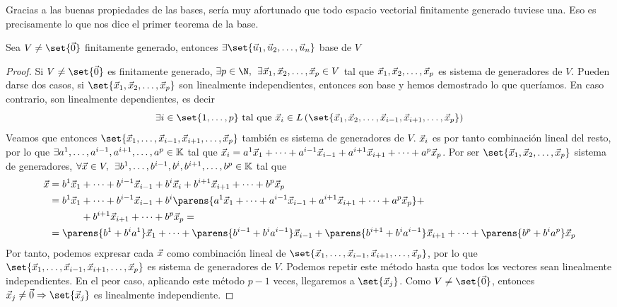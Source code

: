 \documentclass[../algebra_lineal.tex]{subfiles}
\begin{document}
Gracias a las buenas propiedades de las bases, sería muy afortunado que todo espacio vectorial finitamente generado tuviese una. Eso es precisamente lo que nos dice el primer teorema de la base.

\begin{theorem}
    Sea $V \ne \set{\zv}$ finitamente generado, entonces $\exists \set{\vlst{u}{n}}$ base de $V$ 
\end{theorem}

\begin{proof}
    Si $V \ne \set{\zv}$ es finitamente generado, $\exists p \in \N, \spc \exists \vlst{x}{p} \in V$ tal que $\vlst{x}{p}$ es sistema de generadores de $V$. Pueden darse dos casos, si $\set{\vlst{x}{p}}$ son linealmente independientes, entonces son base y hemos demostrado lo que queríamos. En caso contrario, son linealmente dependientes, es decir
    \[
        \exists i \in \set{1, \dots, p} \st \vx_i \in \lspan{\set{\vlst{x}{i-1}, \vx_{i+1}, \dots, \vx_{p}}}
    \]
    Veamos que entonces $\set{\vx_{1}, \dots,  \vx_{i-1}, \vx_{i+1}, \dots, \vx_{p}}$ también es sistema de generadores de $V$. $\vx_i$ es por tanto combinación lineal del resto, por lo que $\exists \islst{a}{p}{i} \in \K$ tal que $\vx_i = \ilincomb{a}{x}{p}{i}$. Por ser $\set{\vlst{x}{p}}$ sistema de generadores, $\forall \vx \in V, \spc \exists \cslst{b}{p}{i} \in \K $ tal que 
    \begin{align*}
        \vx &= \clincomb{b}{x}{p}{i} \\
            &= b^1\vx_{1} + \dots + b^{i-1} \vx_{i-1} + b^i \parens{\ilincomb{a}{x}{p}{i}} + \\
            &\hspace{11.35mm} + b^{i+1} \vx_{i+1} + \dots + b^p \vx_p = \\
            &= \parens{b^1 + b^i a^1}\vx_{1} + \dots + \parens{b^{i-1} + b^i a^{i-1}}\vx_{i-1} + \parens{b^{i+1} + b^i a^{i-1}}\vx_{i+1} + \dots + \parens{b^p + b^i a^p}\vx_{p}
    \end{align*}
    Por tanto, podemos expresar cada $\vx$ como combinación lineal de $\set{\ivlst{x}{p}{i}}$, por lo que $\set{\ivlst{x}{p}{i}}$ es sistema de generadores de $V$. 
    Podemos repetir este método hasta que todos los vectores sean linealmente independientes. En el peor caso, aplicando este método $p-1$ veces, llegaremos a $\set{\vx_j}$. Como $V \ne \set{\zv}$, entonces $\vx_j \ne \zv \Rightarrow \set{\vx_j}$ es linealmente independiente.
\end{proof}
\end{document}
